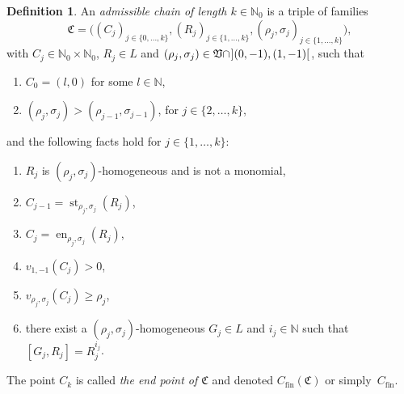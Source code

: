 \documentclass[reqno,a4paper]{amsart}
\theoremstyle{definition}
\newtheorem{definition}[theorem]{Definition}
\theoremstyle{remark}
\DeclareMathOperator{\en}{en}
\DeclareMathOperator{\st}{st}
\begin{document}
\begin{definition}\label{cadena admisible} An {\em admissible chain of length $k\in\mathds{N}_0$} is a triple of families
$$
\mathfrak{C}=\bigl((C_j)_{j\in\{0,\dots,k\}},(R_j)_{j\in\{1,\dots,k\}},(\rho_j,\sigma_j)_{j\in\{1,\dots,k\}}\bigr),
$$
with $C_j\in \mathds{N}_0\times\mathds{N}_0$, $R_j\in L$ and $(\rho_j,\sigma_j)\in\mathfrak{V}\cap \hspace{0.7pt}](0,-1),(1,-1)[\hspace{0.7pt}$, such that

\begin{enumerate}

\smallskip

\item $C_0=(l,0)$ for some $l\in\mathds{N}$,

\smallskip

\item $(\rho_j,\sigma_j)>(\rho_{j-1},\sigma_{j-1})$, for $j\in \{2,\dots,k\}$,

\smallskip
%
\end{enumerate}
%
and the following facts hold for $j\in \{1,\dots,k\}$:
%
\begin{enumerate}[resume*]

\smallskip

\item $R_j$ is $(\rho_j,\sigma_j)$-homogeneous and is not a monomial,

\smallskip

\item $C_{j-1}=\st_{\rho_j,\sigma_j}(R_j)$,

\smallskip

\item $C_j=\en_{\rho_j,\sigma_j}(R_j)$,

\smallskip

\item $v_{1,-1}(C_j)>0$,

\smallskip

\item $v_{\rho_j,\sigma_j}(C_j)\ge\rho_j$,

\smallskip

\item there exist a $(\rho_j,\sigma_j)$-homogeneous $G_j\in L$ and $i_j\in\mathds{N}$ such that $[G_j,R_j]=R_j^{i_j}$.

\smallskip

\end{enumerate}
The point $C_k$ is called {\em the end point of $\mathfrak{C}$} and denoted $C_{\text{fin}}(\mathfrak{C})$ or sim\-ply~$C_{\text{fin}}$.
\end{definition}
\end{document}
